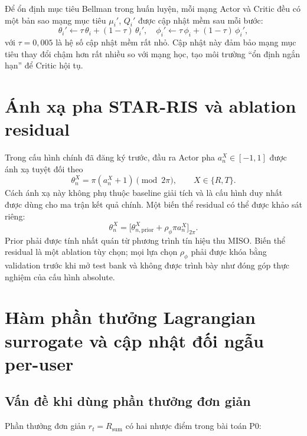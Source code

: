 Để ổn định mục tiêu Bellman trong huấn luyện, mỗi mạng Actor và Critic
đều có một bản sao mạng mục tiêu $\mu_i'$, $Q_i'$ được cập nhật
mềm sau mỗi bước:
\begin{equation}
\theta_i' \leftarrow \tau\,\theta_i + (1 - \tau)\,\theta_i', \quad
\phi_i' \leftarrow \tau\,\phi_i + (1 - \tau)\,\phi_i',
\label{eq:soft_update}
\end{equation}
với $\tau = 0{,}005$ là hệ số cập nhật mềm rất nhỏ. Cập nhật này đảm bảo
mạng mục tiêu thay đổi chậm hơn rất nhiều so với mạng học, tạo môi
trường ``ổn định ngắn hạn'' để Critic hội tụ.

\section{Ánh xạ pha STAR-RIS và ablation residual}
\label{sec:residual_phase}

Trong cấu hình chính đã đăng ký trước, đầu ra Actor pha $a_n^X\in[-1,1]$
được ánh xạ tuyệt đối theo
\begin{equation}
  \theta_n^X = \pi(a_n^X+1) \pmod{2\pi}, \qquad X\in\{R,T\}.
\end{equation}
Cách ánh xạ này không phụ thuộc baseline giải tích và là cấu hình duy nhất
được dùng cho ma trận kết quả chính. Một biến thể residual có thể được khảo
sát riêng:
\begin{equation}
  \theta_n^X = \big[\theta_{n,\mathrm{prior}}^X
  + \rho_{\phi}\pi a_n^X\big]_{2\pi}.
\end{equation}
Prior phải được tính nhất quán từ phương trình tín hiệu thu MISO. Biến thể
residual là một ablation tùy chọn; mọi lựa chọn $\rho_{\phi}$ phải được khóa
bằng validation trước khi mở test bank và không được trình bày như đóng góp
thực nghiệm của cấu hình absolute.

\section{Hàm phần thưởng Lagrangian surrogate và cập nhật đối ngẫu per-user}
\label{sec:adaptive_reward}

\subsection{Vấn đề khi dùng phần thưởng đơn giản}

Phần thưởng đơn giản $r_t = R_{\text{sum}}$ \cite{hieu2021optimal} có hai
nhược điểm trong bài toán P0:


